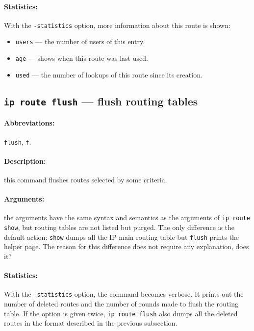 \paragraph{Statistics:} With the \verb|-statistics| option, more
information about this route is shown:
\begin{itemize}
\item \verb|users| --- the number of users of this entry.
\item \verb|age| --- shows when this route was last used.
\item \verb|used| --- the number of lookups of this route since its creation.
\end{itemize}


\subsection{{\tt ip route flush} --- flush routing tables}
\label{IP-ROUTE-FLUSH}

\paragraph{Abbreviations:} \verb|flush|, \verb|f|.

\paragraph{Description:} this command flushes routes selected
by some criteria.

\paragraph{Arguments:} the arguments have the same syntax and semantics
as the arguments of \verb|ip route show|, but routing tables are not
listed but purged. The only difference is the default action: \verb|show|
dumps all the IP main routing table but \verb|flush| prints the helper page.
The reason for this difference does not require any explanation, does it?


\paragraph{Statistics:} With the \verb|-statistics| option, the command
becomes verbose. It prints out the number of deleted routes and the number
of rounds made to flush the routing table. If the option is given
twice, \verb|ip route flush| also dumps all the deleted routes
in the format described in the previous subsection.

